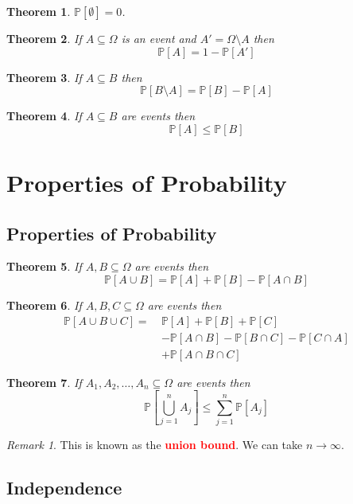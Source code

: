\documentclass{article}
\newcommand{\PP}{\mathbb{P}}
\newcommand{\bfred}[1]{\textcolor{red}{\textbf{#1}}}
\theoremstyle{plain}
\newtheorem{thm}{Theorem}[section]
\theoremstyle{definition}
\theoremstyle{remark}
\newtheorem*{rem}{Remark}
\begin{document}
\begin{thm}
    $\PP[\emptyset] = 0$.
\end{thm}

\begin{thm}
    If $A \subseteq \Omega$ is an event and $A' = \Omega\setminus A$ then \[\PP[A] = 1 - \PP[A']\]
\end{thm}

\begin{thm}
    If $A \subseteq B$ then \[\PP[B\setminus A] = \PP[B] - \PP[A]\]
\end{thm}

\begin{thm}
    If $A \subseteq B$ are events then \[\PP[A] \leq \PP[B]\]
\end{thm}

\section{Properties of Probability}
\subsection{Properties of Probability}

\begin{thm}
    If $A, B \subseteq \Omega$ are events then \[\PP[A \cup B] = \PP[A] + \PP[B] - \PP[A \cap B]\]
\end{thm}

\begin{thm}
    If $A, B, C \subseteq \Omega$ are events then
    \begin{align*}
        \PP[A \cup B \cup C] = \ &\PP[A] + \PP[B] + \PP[C] \\
        &-\PP[A \cap B] - \PP[B \cap C] - \PP[C \cap A] \\
        &+\PP[A \cap B \cap C]
    \end{align*}
\end{thm}

\begin{thm}
    If $A_1, A_2, \dotsc, A_n \subseteq \Omega$ are events then \[\PP\left[\bigcup_{j=1}^{n}A_j\right] \leq \sum_{j=1}^n\PP[A_j]\]
\end{thm}

\begin{rem}
    This is known as the \bfred{union bound}. We can take $n \rightarrow \infty$.
\end{rem}

\subsection{Independence}
\end{document}
